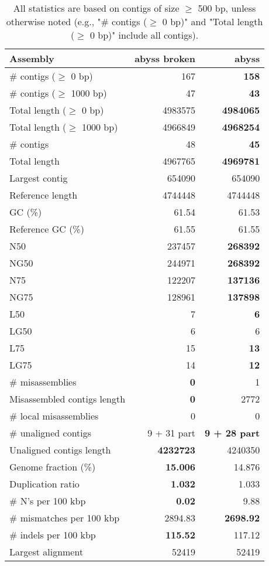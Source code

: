 \documentclass[12pt,a4paper]{article}
\begin{document}
\begin{table}[ht]
\begin{center}
\caption{All statistics are based on contigs of size $\geq$ 500 bp, unless otherwise noted (e.g., "\# contigs ($\geq$ 0 bp)" and "Total length ($\geq$ 0 bp)" include all contigs).}
\begin{tabular}{|l*{2}{|r}|}
\hline
Assembly & abyss broken & abyss \\ \hline
\# contigs ($\geq$ 0 bp) & 167 & {\bf 158} \\ \hline
\# contigs ($\geq$ 1000 bp) & 47 & {\bf 43} \\ \hline
Total length ($\geq$ 0 bp) & 4983575 & {\bf 4984065} \\ \hline
Total length ($\geq$ 1000 bp) & 4966849 & {\bf 4968254} \\ \hline
\# contigs & 48 & {\bf 45} \\ \hline
Total length & 4967765 & {\bf 4969781} \\ \hline
Largest contig & 654090 & 654090 \\ \hline
Reference length & 4744448 & 4744448 \\ \hline
GC (\%) & 61.54 & 61.53 \\ \hline
Reference GC (\%) & 61.55 & 61.55 \\ \hline
N50 & 237457 & {\bf 268392} \\ \hline
NG50 & 244971 & {\bf 268392} \\ \hline
N75 & 122207 & {\bf 137136} \\ \hline
NG75 & 128961 & {\bf 137898} \\ \hline
L50 & 7 & {\bf 6} \\ \hline
LG50 & 6 & 6 \\ \hline
L75 & 15 & {\bf 13} \\ \hline
LG75 & 14 & {\bf 12} \\ \hline
\# misassemblies & {\bf 0} & 1 \\ \hline
Misassembled contigs length & {\bf 0} & 2772 \\ \hline
\# local misassemblies & 0 & 0 \\ \hline
\# unaligned contigs & 9 + 31 part & {\bf 9 + 28 part} \\ \hline
Unaligned contigs length & {\bf 4232723} & 4240350 \\ \hline
Genome fraction (\%) & {\bf 15.006} & 14.876 \\ \hline
Duplication ratio & {\bf 1.032} & 1.033 \\ \hline
\# N's per 100 kbp & {\bf 0.02} & 9.88 \\ \hline
\# mismatches per 100 kbp & 2894.83 & {\bf 2698.92} \\ \hline
\# indels per 100 kbp & {\bf 115.52} & 117.12 \\ \hline
Largest alignment & 52419 & 52419 \\ \hline
\end{tabular}
\end{center}
\end{table}
\end{document}
